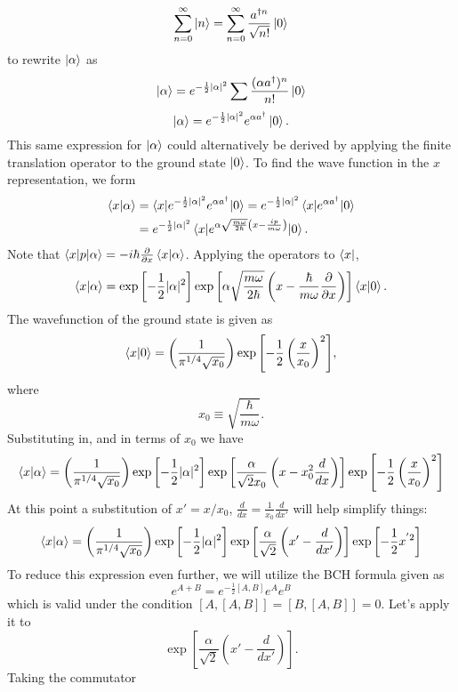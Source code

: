 \documentclass[11pt,letterpaper]{article}
\begin{document}
\begin{enumerate}
\begin{enumerate}
  $$\sum_{n=0}^\infty{\ket n} = \sum_{n=0}^\infty{\frac{a^{\dag n}}{\sqrt{n!}}\ket 0}$$
  to rewrite $\ket\alpha$ as
  $$\ket\alpha = e^{-\frac{1}{2}|\alpha|^2}\sum{\frac{(\alpha a^\dag)^n}{n!}\ket 0}$$
  \begin{equation}\label{1}\ket\alpha = e^{-\frac{1}{2}|\alpha|^2}e^{\alpha a^\dag}\ket 0.\end{equation}
  This same expression for $\ket\alpha$ could alternatively be derived by applying the finite translation operator to the ground state $\ket 0$. To find the wave function in the $x$ representation, we form
  \begin{align*}\braket{x|\alpha} &= \braket{x|e^{-\frac{1}{2}|\alpha|^2}e^{\alpha a^\dag}|0} = e^{-\frac{1}{2}|\alpha|^2}\braket{x|e^{\alpha a^\dag}|0}\\
  &=e^{-\frac{1}{2}|\alpha|^2}\braket{x|e^{\alpha\sqrt{\frac{m\omega}{2\hbar}}\left(x-\frac{ip}{m\omega}\right)}|0}.
  \end{align*}
  Note that $\braket{x|p|\alpha} = -i\hbar\frac{\partial}{\partial x}\braket{x|\alpha}$. Applying the operators to $\bra x$,
  $$\braket{x|\alpha} = \exp{\left[-\frac{1}{2}|\alpha|^2\right]}\exp{\left[\alpha\sqrt{\frac{m\omega}{2\hbar}}\left(x-\frac{\hbar}{m\omega}\frac{\partial}{\partial x}\right)\right]}\braket{x|0}.$$
  The wavefunction of the ground state is given as
  \begin{equation}\label{2}\braket{x|0} = \left(\frac{1}{\pi^{1/4}\sqrt{x_0}}\right)\exp{\left[-\frac{1}{2}\left(\frac{x}{x_0}\right)^2\right]},\end{equation}
  where
  $$x_0 \equiv \sqrt{\frac{\hbar}{m\omega}}.$$
  Substituting in, and in terms of $x_0$ we have
  $$\braket{x|\alpha} = \left(\frac{1}{\pi^{1/4}\sqrt{x_0}}\right) \exp{\left[-\frac{1}{2}|\alpha|^2\right]}\exp{\left[\frac{\alpha}{\sqrt 2x_0}\left(x-x_0^2\frac{d}{dx}\right)\right]}\exp{\left[-\frac{1}{2}\left(\frac{x}{x_0}\right)^2\right]}$$
  At this point a substitution of $x' = x/x_0$, $\frac{d}{dx} = \frac{1}{x_0}\frac{d}{dx'}$ will help simplify things:
    $$\braket{x|\alpha} = \left(\frac{1}{\pi^{1/4}\sqrt{x_0}}\right) \exp{\left[-\frac{1}{2}|\alpha|^2\right]}\exp{\left[\frac{\alpha}{\sqrt 2}\left(x'-\frac{d}{dx'}\right)\right]}\exp{\left[-\frac{1}{2}x^{'2}\right]}$$
To reduce this expression even further, we will utilize the BCH formula given as
$$e^{A+B} = e^{-\frac{1}{2}[A,B]}e^Ae^B$$
  which is valid under the condition $[A,[A,B]] = [B,[A,B]] = 0$. Let's apply it to
  $$\exp{\left[\frac{\alpha}{\sqrt 2}\left(x'-\frac{d}{dx'}\right)\right]}.$$
  Taking the commutator

\end{enumerate}
\end{enumerate}
\end{document}
